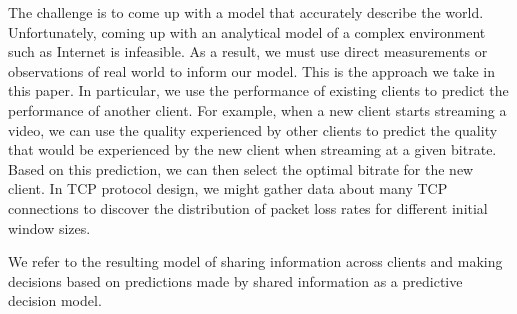 The challenge is to come up with a model that accurately describe the
world. Unfortunately, coming up with an analytical model of a complex
environment such as Internet is infeasible. As a result, we must use
direct measurements or observations of real world to inform our
model. This is the approach we take in this paper. In particular, we
use the performance of existing clients to predict the performance of
another client. For example, when a new client starts streaming a
video, we can use the quality experienced by other clients to predict
the quality that would be experienced by the new client when streaming
at a given bitrate. Based on this prediction, we can then select the
optimal bitrate for the new client.  In TCP protocol design, we might
gather data about many TCP connections to discover the distribution of
packet loss rates for different initial window sizes.  

We refer to the resulting model of sharing information
across clients and making decisions based on predictions made by
shared information as a predictive decision model. 




 
